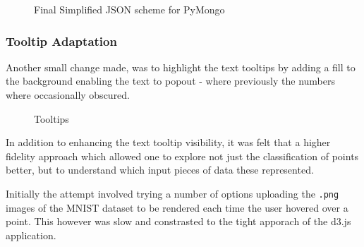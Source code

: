 \documentclass[a4paper,11pt,titlepage]{article}
\begin{document}
	\begin{figure}[H]
    			\caption{Final Simplified JSON scheme for PyMongo}%
	\end{figure}
	
	\subsubsection{Tooltip Adaptation}
	Another small change made, was to highlight the text tooltips by adding a fill to the background enabling the text to popout - where previously the numbers where occasionally obscured.
	\par 
	
	\begin{figure}[H]
    			\caption{Tooltips}%
	\end{figure}	
	
	In addition to enhancing the text tooltip visibility, it was felt that a higher fidelity approach which allowed one to explore not just the classification of points better, but to understand which input pieces of data these represented. 
	\par 
	Initially the attempt involved trying a number of options uploading the \texttt{.png} images of the MNIST dataset to be rendered each time the user hovered over a point. This however was slow and constrasted to the tight apporach of the d3.js application. 
	
\end{document}
